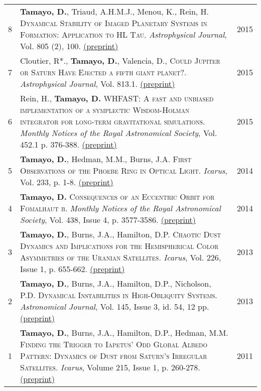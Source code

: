 \documentclass[10pt]{article} %
\begin{document}
{\begin{tabular}{>{\hfill}r|p{14.3cm}l}
8 & {\bf Tamayo, D.}, Triaud, A.H.M.J., Menou, K., Rein, H. \textsc{Dynamical Stability of Imaged Planetary Systems in Formation:  Application to HL Tau}. {\it Astrophysical Journal}, Vol. 805 (2), 100. \href{http://arxiv.org/abs/1502.05099}{(preprint)} & 2015 \\

7 & Cloutier, R*., {\bf Tamayo, D.}, Valencia, D., \textsc{Could Jupiter or Saturn Have Ejected a fifth giant planet?}.  {\it Astrophysical Journal}, Vol. 813.1. \href{http://arxiv.org/abs/1509.05397}{(preprint)} & 2015 \\

6 & Rein, H., {\bf Tamayo, D.} \textsc{WHFAST: A fast and unbiased implementation of a symplectic Wisdom-Holman integrator for long-term gravitational simulations}. {\it Monthly Notices of the Royal Astronomical Society}, Vol. 452.1 p. 376-388. \href{http://arxiv.org/abs/1506.01084}{(preprint)} & 2015 \\

5 & {\bf Tamayo, D.}, Hedman, M.M., Burns, J.A. \textsc{First Observations of the Phoebe Ring in Optical Light}. {\it Icarus}, Vol. 233, p. 1-8. \href{http://arxiv.org/abs/1401.6166}{(preprint)}& 2014  \\

4 & {\bf Tamayo, D.} \textsc{Consequences of an Eccentric Orbit for Fomalhaut b}. {\it Monthly Notices of the Royal Astronomical Society}, Vol. 438, Issue 4, p. 3577-3586. \href{http://arxiv.org/abs/1312.7020}{(preprint)} & 2014 \\

3 & {\bf Tamayo, D.}, Burns, J.A., Hamilton, D.P. \textsc{Chaotic Dust Dynamics and Implications for the Hemispherical Color Asymmetries of the Uranian Satellites}. {\it Icarus}, Vol. 226, Issue 1, p. 655-662. \href{http://arxiv.org/abs/1306.3973}{(preprint)} & 2013 \\ 

2 & {\bf Tamayo, D.}, Burns, J.A., Hamilton, D.P., Nicholson, P.D. \textsc{Dynamical Instabilities in High-Obliquity Systems}. {\it Astronomical Journal}, Vol. 145, Issue 3, id. 54, 12 pp. \href{http://arxiv.org/abs/1212.0028}{(preprint)} & 2013 \\

1 & {\bf Tamayo, D.}, Burns, J.A., Hamilton, D.P., Hedman, M.M. \textsc{Finding the Trigger to Iapetus' Odd Global Albedo Pattern: Dynamics of Dust from Saturn's Irregular Satellites}. {\it Icarus}, Volume 215, Issue 1, p. 260-278. \href{http://arxiv.org/abs/1106.1893}{(preprint)} & 2011 \\


\end{tabular}}
\end{document}
